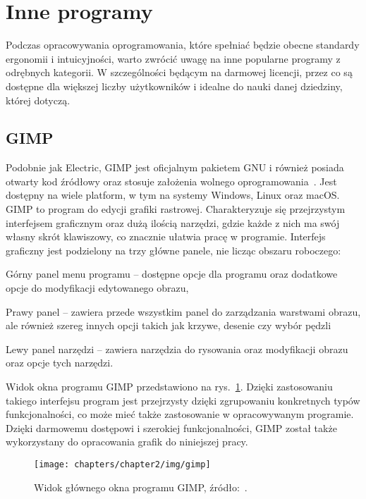 \section{Inne programy}
\label{sec:inne_programy}

Podczas opracowywania oprogramowania,
które spełniać będzie obecne standardy ergonomii i intuicyjności,
warto zwrócić uwagę na inne popularne programy z odrębnych kategorii.
W szczególności będącym na darmowej licencji,
przez co są dostępne dla większej liczby użytkowników
i idealne do nauki danej dziedziny, której dotyczą.

\subsection{GIMP}
\label{subsec:gimp}

Podobnie jak Electric, GIMP jest oficjalnym pakietem GNU i również posiada otwarty kod źródłowy
oraz stosuje założenia wolnego oprogramowania~\cite{gimp_site}.
Jest dostępny na wiele platform, w tym na systemy Windows, Linux oraz macOS.
GIMP to program do edycji grafiki rastrowej.
Charakteryzuje się przejrzystym interfejsem graficznym oraz dużą ilością narzędzi,
gdzie każde z nich ma swój własny skrót klawiszowy, co znacznie ułatwia pracę w programie.
\indent Interfejs graficzny jest podzielony na trzy główne panele, nie licząc obszaru roboczego:

\begin{citemize}
    \item Górny panel menu programu -- dostępne opcje dla programu oraz dodatkowe opcje do modyfikacji edytowanego obrazu,
    \item Prawy panel -- zawiera przede wszystkim panel do zarządzania warstwami obrazu,
    ale również szereg innych opcji takich jak krzywe, desenie czy wybór pędzli
    \item Lewy panel narzędzi -- zawiera narzędzia do rysowania oraz modyfikacji obrazu oraz opcje tych narzędzi.
\end{citemize}

Widok okna programu GIMP przedstawiono na rys.~\ref{fig:gimp_okno}.
Dzięki zastosowaniu takiego interfejsu program jest przejrzysty dzięki zgrupowaniu konkretnych typów funkcjonalności,
co może mieć także zastosowanie w opracowywanym programie. \\
\indent Dzięki darmowemu dostępowi i szerokiej funkcjonalności,
GIMP został także wykorzystany do opracowania grafik do niniejszej pracy.

\begin{figure}[h]
    \centering
    \texttt{[image: chapters/chapter2/img/gimp]}
    \caption[Widok głównego okna programu GIMP.]{Widok głównego okna programu GIMP, źródło:~\cite{gimp_site}.}
    \label{fig:gimp_okno}
\end{figure}

